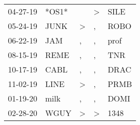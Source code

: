 \begin{supertabular}{p{0.07\textwidth}p{0.06\textwidth}p{0.02\textwidth}p{0.02\textwidth}p{0.06\textwidth}}
          04-27-19\textsuperscript{} &                            *OS1* &                  &     \textgreater &           SILE\textsuperscript{} \\
          05-24-19\textsuperscript{} &           JUNK\textsuperscript{} &     \textgreater &                , &           ROBO\textsuperscript{} \\
          06-22-19\textsuperscript{} &            JAM\textsuperscript{} &                , &                , &           prof\textsuperscript{} \\
          08-15-19\textsuperscript{} &           REME\textsuperscript{} &                , &                , &            TNR\textsuperscript{} \\
          10-17-19\textsuperscript{} &           CABL\textsuperscript{} &                , &                , &           DRAC\textsuperscript{} \\
          11-02-19\textsuperscript{} &           LINE\textsuperscript{} &     \textgreater &                , &           PRMB\textsuperscript{} \\
          01-19-20\textsuperscript{} &           milk\textsuperscript{} &                , &                , &           DOMI\textsuperscript{} \\
          02-28-20\textsuperscript{} &           WGUY\textsuperscript{} &     \textgreater &     \textgreater &           1348\textsuperscript{} \\
\end{supertabular}
